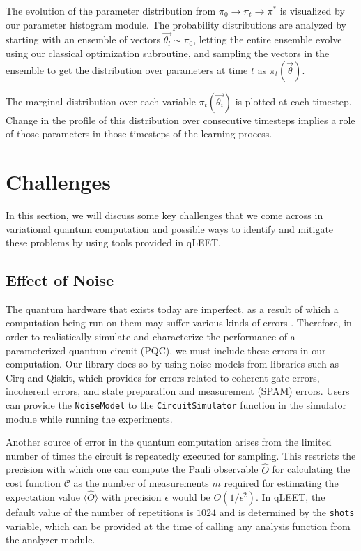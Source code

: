 \documentclass[%
 reprint,
 amsmath,
 amssymb,
 showkeys,
 pra,
 floatfix,
]{revtex4-2}
\begin{document}
The evolution of the parameter distribution from $\pi_0 \rightarrow \pi_t \rightarrow \pi^*$ is visualized by our parameter histogram module. The probability distributions are analyzed by starting with an ensemble of vectors $\vec{\theta_l} \sim \pi_0$, letting the entire ensemble evolve using our classical optimization subroutine, and sampling the vectors in the ensemble to get the distribution over parameters at time $t$ as $\pi_t(\vec{\theta})$. 

The marginal distribution over each variable $\pi_t(\vec{\theta_i})$ is plotted at each timestep. Change in the profile of this distribution over consecutive timesteps implies a role of those parameters in those timesteps of the learning process.


\section{\label{sec:challenges}Challenges}

In this section, we will discuss some key challenges that we come across in variational quantum computation and possible ways to identify and mitigate these problems by using tools provided in qLEET.

\subsection{Effect of Noise}

The quantum hardware that exists today are imperfect, as a result of which a computation being run on them may suffer various kinds of errors \cite{Chaudhary2022-kl}. Therefore, in order to realistically simulate and characterize the performance of a parameterized quantum circuit (PQC), we must include these errors in our computation. Our library does so by using noise models from libraries such as Cirq and Qiskit, which provides for errors related to coherent gate errors, incoherent errors, and state preparation and measurement (SPAM) errors. Users can provide the \texttt{NoiseModel} to the \texttt{CircuitSimulator} function in the simulator module while running the experiments. 

Another source of error in the quantum computation arises from the limited number of times the circuit is repeatedly executed for sampling. This restricts the precision with which one can compute the Pauli observable $\hat{O}$ for calculating the cost function $\mathcal{C}$ as the number of measurements $m$ required for estimating the expectation value $\langle\hat{O}\rangle$ with precision $\epsilon$ would be $O(1/\epsilon^2)$. In qLEET, the default value of the number of repetitions is $1024$ and is determined by the \texttt{shots} variable, which can be provided at the time of calling any analysis function from the analyzer module.
\end{document}
